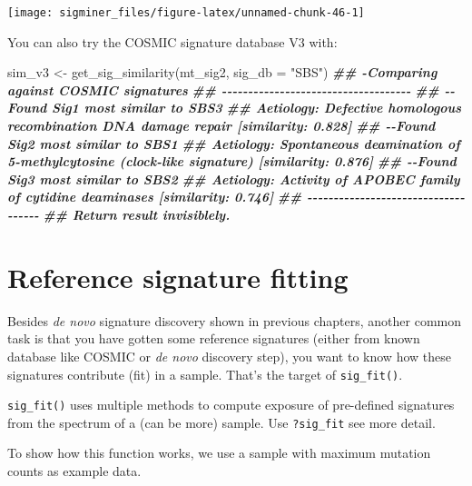 \documentclass[
  12pt,
  a4paper,
  twoside]{book}
\newenvironment{Shaded}{\begin{snugshade}}{\end{snugshade}}
\newcommand{\AttributeTok}[1]{\textcolor[rgb]{0.77,0.63,0.00}{#1}}
\newcommand{\ConstantTok}[1]{\textcolor[rgb]{0.00,0.00,0.00}{#1}}
\newcommand{\DecValTok}[1]{\textcolor[rgb]{0.00,0.00,0.81}{#1}}
\newcommand{\DocumentationTok}[1]{\textcolor[rgb]{0.56,0.35,0.01}{\textbf{\textit{#1}}}}
\newcommand{\FunctionTok}[1]{\textcolor[rgb]{0.00,0.00,0.00}{#1}}
\newcommand{\NormalTok}[1]{#1}
\newcommand{\OtherTok}[1]{\textcolor[rgb]{0.56,0.35,0.01}{#1}}
\newcommand{\SpecialCharTok}[1]{\textcolor[rgb]{0.00,0.00,0.00}{#1}}
\newcommand{\StringTok}[1]{\textcolor[rgb]{0.31,0.60,0.02}{#1}}
\begin{document}
\texttt{[image: sigminer\_files/figure-latex/unnamed-chunk-46-1]}

You can also try the COSMIC signature database V3 with:

\begin{Shaded}
\begin{Highlighting}[]
\NormalTok{sim\_v3 }\OtherTok{\textless{}{-}} \FunctionTok{get\_sig\_similarity}\NormalTok{(mt\_sig2, }\AttributeTok{sig\_db =} \StringTok{"SBS"}\NormalTok{)}
\DocumentationTok{\#\# {-}Comparing against COSMIC signatures}
\DocumentationTok{\#\# {-}{-}{-}{-}{-}{-}{-}{-}{-}{-}{-}{-}{-}{-}{-}{-}{-}{-}{-}{-}{-}{-}{-}{-}{-}{-}{-}{-}{-}{-}{-}{-}{-}{-}{-}{-}}
\DocumentationTok{\#\# {-}{-}Found Sig1 most similar to SBS3}
\DocumentationTok{\#\#    Aetiology: Defective homologous recombination DNA damage repair [similarity: 0.828]}
\DocumentationTok{\#\# {-}{-}Found Sig2 most similar to SBS1}
\DocumentationTok{\#\#    Aetiology: Spontaneous deamination of 5{-}methylcytosine (clock{-}like signature) [similarity: 0.876]}
\DocumentationTok{\#\# {-}{-}Found Sig3 most similar to SBS2}
\DocumentationTok{\#\#    Aetiology: Activity of APOBEC family of cytidine deaminases [similarity: 0.746]}
\DocumentationTok{\#\# {-}{-}{-}{-}{-}{-}{-}{-}{-}{-}{-}{-}{-}{-}{-}{-}{-}{-}{-}{-}{-}{-}{-}{-}{-}{-}{-}{-}{-}{-}{-}{-}{-}{-}{-}{-}}
\DocumentationTok{\#\# Return result invisiblely.}
\end{Highlighting}
\end{Shaded}

\hypertarget{reference-signature-fitting}{%
\section{Reference signature fitting}\label{reference-signature-fitting}}

Besides \emph{de novo} signature discovery shown in previous chapters, another common task is that
you have gotten some reference signatures (either from known database like COSMIC or \emph{de novo} discovery step), you want to know how these signatures contribute (fit) in a sample. That's the target of \texttt{sig\_fit()}.

\texttt{sig\_fit()} uses multiple methods to compute exposure of pre-defined signatures from the spectrum of a (can be more) sample. Use \texttt{?sig\_fit} see more detail.

To show how this function works, we use a sample with maximum mutation counts as example data.

\begin{Shaded}
\end{Shaded}
\end{document}
